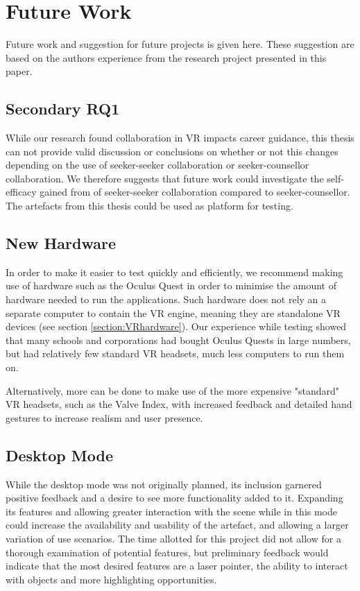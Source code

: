 \section{Future Work}
Future work and suggestion for future projects is given here. These suggestion are based on the authors experience from the research project presented in this paper. 

\label{section:futureWork}

\subsection{Secondary RQ1}
While our research found collaboration in VR impacts career guidance, this thesis can not provide valid discussion or conclusions on whether or not this changes depending on the use of seeker-seeker collaboration or seeker-counsellor collaboration. We therefore suggests that future work could investigate the self-efficacy gained from of seeker-seeker collaboration compared to seeker-counsellor. The artefacts from this thesis could be used as platform for testing.  

\subsection{New Hardware}
In order to make it easier to test quickly and efficiently, we recommend making use of hardware such as the Oculus Quest \cite{hillmann2019comparing} in order to minimise the amount of hardware needed to run the applications. Such hardware does not rely an a separate computer to contain the VR engine, meaning they are standalone VR devices (see section \ref{section:VRhardware}). Our experience while testing showed that many schools and corporations had bought Oculus Quests in large numbers, but had relatively few standard VR headsets, much less computers to run them on. 

Alternatively, more can be done to make use of the more expensive "standard" VR headsets, such as the Valve Index, with increased feedback and detailed hand gestures to increase realism and user presence.

\subsection{Desktop Mode}
While the desktop mode was not originally planned, its inclusion garnered positive feedback and a desire to see more functionality added to it. Expanding its features and allowing greater interaction with the scene while in this mode could increase the availability and usability of the artefact, and allowing a larger variation of use scenarios. The time allotted for this project did not allow for a thorough examination of potential features, but preliminary feedback would indicate that the most desired features are a laser pointer, the ability to interact with objects and more highlighting opportunities.

